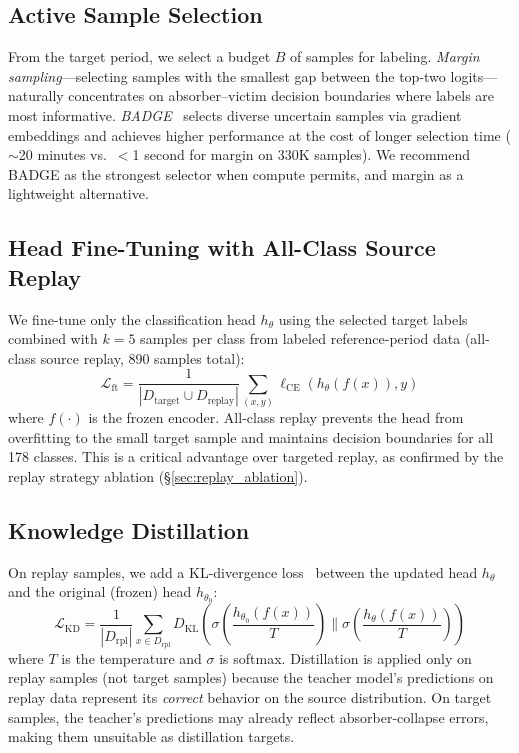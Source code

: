 \documentclass[journal]{IEEEtran}
\begin{document}
\subsection{Active Sample Selection}
\label{sec:sample_select}

From the target period, we select a budget $B$ of samples for labeling.
\textit{Margin sampling}---selecting samples with the smallest gap between the top-two logits---naturally concentrates on absorber--victim decision boundaries where labels are most informative.
\textit{BADGE}~\cite{ash2020badge} selects diverse uncertain samples via gradient embeddings and achieves higher performance at the cost of longer selection time (${\sim}$20 minutes vs.\ $<$1 second for margin on 330K samples).
We recommend BADGE as the strongest selector when compute permits, and margin as a lightweight alternative.

\subsection{Head Fine-Tuning with All-Class Source Replay}
\label{sec:ft_replay}

We fine-tune only the classification head $h_\theta$ using the selected target labels combined with $k{=}5$ samples per class from labeled reference-period data (all-class source replay, 890 samples total):
\begin{equation}
  \mathcal{L}_{\text{ft}} = \frac{1}{|D_{\text{target}} \cup D_{\text{replay}}|} \sum_{(x,y)} \ell_{\text{CE}}(h_\theta(f(x)), y)
\end{equation}
where $f(\cdot)$ is the frozen encoder.
All-class replay prevents the head from overfitting to the small target sample and maintains decision boundaries for all 178 classes. This is a critical advantage over targeted replay, as confirmed by the replay strategy ablation (\S\ref{sec:replay_ablation}).

\subsection{Knowledge Distillation}
\label{sec:distill}

On replay samples, we add a KL-divergence loss~\cite{hinton2015distilling} between the updated head $h_\theta$ and the original (frozen) head $h_{\theta_0}$:
\begin{equation}
  \mathcal{L}_{\text{KD}} = \frac{1}{|D_{\text{rpl}}|} \!\sum_{x \in D_{\text{rpl}}} D_{\text{KL}}\!\!\left(\sigma\!\!\left(\frac{h_{\theta_0}\!(f(x))}{T}\right) \!\Big\|\! \sigma\!\!\left(\frac{h_\theta\!(f(x))}{T}\right)\!\right)
\end{equation}
where $T$ is the temperature and $\sigma$ is softmax.
Distillation is applied only on replay samples (not target samples) because the teacher model's predictions on replay data represent its \textit{correct} behavior on the source distribution.
On target samples, the teacher's predictions may already reflect absorber-collapse errors, making them unsuitable as distillation targets.
\end{document}
